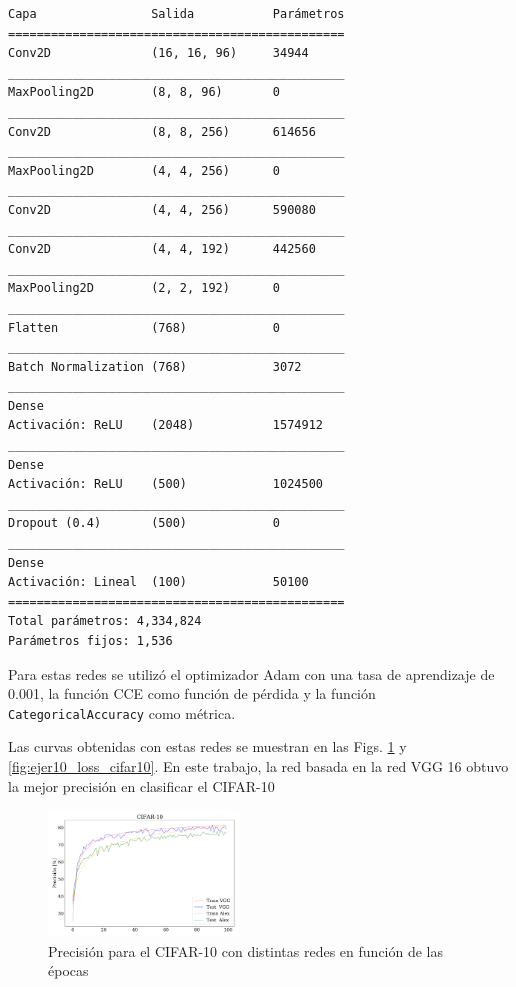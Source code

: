 \begin{verbatim}
Capa                Salida           Parámetros
===============================================
Conv2D              (16, 16, 96)     34944  
_______________________________________________
MaxPooling2D        (8, 8, 96)       0      
_______________________________________________
Conv2D              (8, 8, 256)      614656 
_______________________________________________
MaxPooling2D        (4, 4, 256)      0      
_______________________________________________
Conv2D              (4, 4, 256)      590080 
_______________________________________________
Conv2D              (4, 4, 192)      442560 
_______________________________________________
MaxPooling2D        (2, 2, 192)      0      
_______________________________________________
Flatten             (768)            0      
_______________________________________________
Batch Normalization (768)            3072   
_______________________________________________
Dense                                          
Activación: ReLU    (2048)           1574912
_______________________________________________
Dense                                          
Activación: ReLU    (500)            1024500
_______________________________________________
Dropout (0.4)       (500)            0      
_______________________________________________
Dense                                          
Activación: Lineal  (100)            50100  
===============================================
Total parámetros: 4,334,824
Parámetros fijos: 1,536
\end{verbatim}


Para estas redes se utilizó el optimizador Adam con una tasa de aprendizaje de 0.001, la función CCE como función de pérdida y la función \verb|CategoricalAccuracy| como métrica.

Las curvas obtenidas con estas redes se muestran en las Figs. \ref{fig:ejer10_acc_cifar10} y \ref{fig:ejer10_loss_cifar10}. En este trabajo, la red basada en la red VGG 16 obtuvo la mejor precisión en clasificar el CIFAR-10

\begin{figure}[H]
    \begin{small}
        \begin{center}
            \includegraphics[width=0.45\textwidth]{Graphs/ejer10_acc_cifar10.pdf}
        \end{center}
        \caption{Precisión para el CIFAR-10 con distintas redes en función de las épocas}
        \label{fig:ejer10_acc_cifar10}
    \end{small}
\end{figure}



